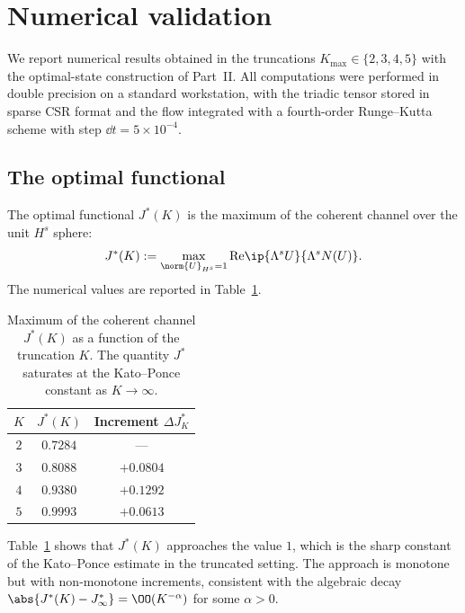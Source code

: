 \section{Numerical validation}
\label{part-4:sec:numerical}

We report numerical results obtained in the truncations 
$K_{\max}\in\{2,3,4,5\}$ with the optimal-state construction of 
Part~II. All computations were performed in double precision on a 
standard workstation, with the triadic tensor stored in sparse CSR 
format and the flow integrated with a fourth-order Runge--Kutta 
scheme with step $\dd t = 5\times 10^{-4}$.

\subsection{The optimal functional}
\label{part-4:ssec:optimal-numeric}

The optimal functional $J^\ast(K)$ is the maximum of the coherent 
channel over the unit $H^s$ sphere:
\begin{equation}\label{part-4:eq:J-def}
J^\ast(K) := \max_{\norm{U}_{H^s}=1}\mathrm{Re}\ip{\Lambda^s U}{\Lambda^s N(U)}.
\end{equation}
The numerical values are reported in Table~\ref{part-4:tab:J-values}.

\begin{table}[h]
\centering
\caption{Maximum of the coherent channel $J^\ast(K)$ as a function 
of the truncation $K$. The quantity $J^\ast$ saturates at the 
Kato--Ponce constant as $K\to\infty$.}
\label{part-4:tab:J-values}
\begin{tabular}{ccc}
\toprule
$K$ & $J^\ast(K)$ & Increment $\Delta J^\ast_K$ \\
\midrule
$2$ & $0.7284$ & --- \\
$3$ & $0.8088$ & $+0.0804$ \\
$4$ & $0.9380$ & $+0.1292$ \\
$5$ & $0.9993$ & $+0.0613$ \\
\bottomrule
\end{tabular}
\end{table}

\begin{remark}[Saturation]\label{part-4:rem:J-saturation}
Table~\ref{part-4:tab:J-values} shows that $J^\ast(K)$ approaches the value 
$1$, which is the sharp constant of the Kato--Ponce estimate in the 
truncated setting. The approach is monotone but with non-monotone 
increments, consistent with the algebraic decay 
$\abs{J^\ast(K) - J^\ast_\infty} = \OO(K^{-\alpha})$ for some 
$\alpha>0$.
\end{remark}

